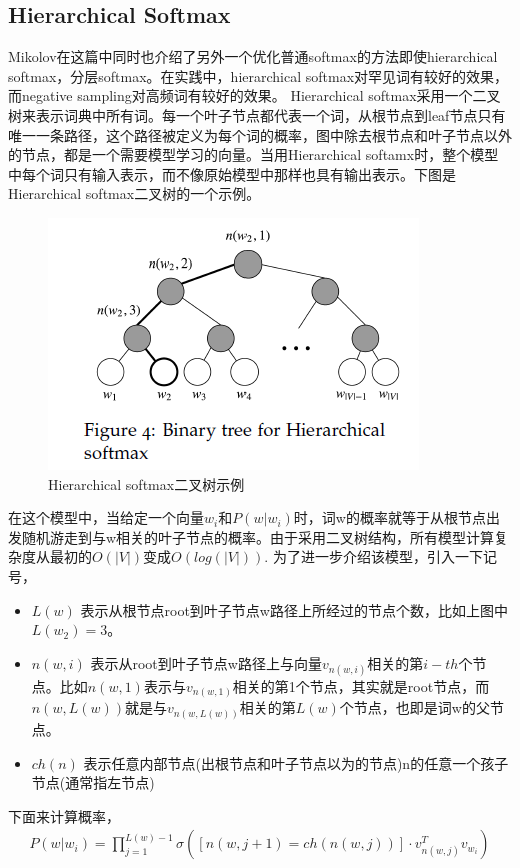 \documentclass[twoside,nofonts,fancyhdr,openany,UTF8]{ctexbook}
\begin{document}
\subsection{Hierarchical Softmax}
Mikolov在这篇中同时也介绍了另外一个优化普通softmax的方法即使hierarchical softmax，分层softmax。在实践中，hierarchical softmax对罕见词有较好的效果，而negative sampling对高频词有较好的效果。
Hierarchical softmax采用一个二叉树来表示词典中所有词。每一个叶子节点都代表一个词，从根节点到leaf节点只有唯一一条路径，这个路径被定义为每个词的概率，图中除去根节点和叶子节点以外的节点，都是一个需要模型学习的向量。当用Hierarchical softamx时，整个模型中每个词只有输入表示，而不像原始模型中那样也具有输出表示。下图是Hierarchical softmax二叉树的一个示例。
\begin{figure}
\centering
\includegraphics[scale=0.8]{hierarchical}
\caption{Hierarchical softmax二叉树示例}
\end{figure}
在这个模型中，当给定一个向量$w_i$和$P(w|w_i)$时，词w的概率就等于从根节点出发随机游走到与w相关的叶子节点的概率。由于采用二叉树结构，所有模型计算复杂度从最初的$O(|V|)$变成$O(log(|V|))$.
为了进一步介绍该模型，引入一下记号，
\begin{itemize}
\item $L(w)$ 表示从根节点root到叶子节点w路径上所经过的节点个数，比如上图中$L(w_2)=3$。

\item $n(w,i)$ 表示从root到叶子节点w路径上与向量$v_{n(w,i)}$相关的第$i-th$个节点。比如$n(w,1)$表示与$v_{n(w,1)}$相关的第1个节点，其实就是root节点，而$n(w,L(w))$就是与$v_{n(w,L(w))}$相关的第$L(w)$个节点，也即是词w的父节点。

\item $ch(n)$ 表示任意内部节点(出根节点和叶子节点以为的节点)n的任意一个孩子节点(通常指左节点)
\end{itemize}
下面来计算概率，
\begin{align}
P(w|w_i) = \prod_{j=1}^{L(w)-1} \sigma{([n(w,j+1) = ch(n(w,j))] \cdot v_{n(w,j)}^Tv_{w_i})}
\end{align}
\end{document}
